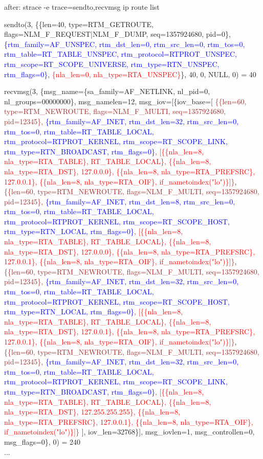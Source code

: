 \documentclass[unicode]{beamer}
\begin{document}
\begin{frame}[fragile]{\small after: strace -e trace=sendto,recvmsg ip route list}

{\texttt\tiny
\fontsize{4pt}{4pt}\selectfont
sendto(3, \{\{len=40, type=RTM\_GETROUTE, flags=NLM\_F\_REQUEST|NLM\_F\_DUMP, seq=1357924680, pid=0\},
 \textcolor{blue}{\{rtm\_family=AF\_UNSPEC, rtm\_dst\_len=0, rtm\_src\_len=0, rtm\_tos=0, rtm\_table=RT\_TABLE\_UNSPEC, rtm\_protocol=RTPROT\_UNSPEC, rtm\_scope=RT\_SCOPE\_UNIVERSE, rtm\_type=RTN\_UNSPEC, rtm\_flags=0\}},
  \textcolor{red}{\{nla\_len=0, nla\_type=RTA\_UNSPEC\}}\}, 40, 0, NULL, 0) = 40

\medskip

recvmsg(3, \{msg\_name=\{sa\_family=AF\_NETLINK, nl\_pid=0, nl\_groups=00000000\}, msg\_namelen=12, msg\_iov=[\{iov\_base=[
\textcolor{brown}{\{\{len=60, type=RTM\_NEWROUTE, flags=NLM\_F\_MULTI, seq=1357924680, pid=12345\},
 \textcolor{blue}{\{rtm\_family=AF\_INET, rtm\_dst\_len=32, rtm\_src\_len=0, rtm\_tos=0, rtm\_table=RT\_TABLE\_LOCAL, rtm\_protocol=RTPROT\_KERNEL, rtm\_scope=RT\_SCOPE\_LINK, rtm\_type=RTN\_BROADCAST, rtm\_flags=0\}},
  \textcolor{red}{[\{\{nla\_len=8, nla\_type=RTA\_TABLE\}, RT\_TABLE\_LOCAL\}, \{\{nla\_len=8, nla\_type=RTA\_DST\}, 127.0.0.0\}, \{\{nla\_len=8, nla\_type=RTA\_PREFSRC\}, 127.0.0.1\}, \{\{nla\_len=8, nla\_type=RTA\_OIF\}, if\_nametoindex("lo")\}]}\}},
\textcolor{brown}{\{\{len=60, type=RTM\_NEWROUTE, flags=NLM\_F\_MULTI, seq=1357924680, pid=12345\},
 \textcolor{blue}{\{rtm\_family=AF\_INET, rtm\_dst\_len=8, rtm\_src\_len=0, rtm\_tos=0, rtm\_table=RT\_TABLE\_LOCAL, rtm\_protocol=RTPROT\_KERNEL, rtm\_scope=RT\_SCOPE\_HOST, rtm\_type=RTN\_LOCAL, rtm\_flags=0\}},
  \textcolor{red}{[\{\{nla\_len=8, nla\_type=RTA\_TABLE\}, RT\_TABLE\_LOCAL\}, \{\{nla\_len=8, nla\_type=RTA\_DST\}, 127.0.0.0\}, \{\{nla\_len=8, nla\_type=RTA\_PREFSRC\}, 127.0.0.1\}, \{\{nla\_len=8, nla\_type=RTA\_OIF\}, if\_nametoindex("lo")\}]}\}},
\textcolor{brown}{\{\{len=60, type=RTM\_NEWROUTE, flags=NLM\_F\_MULTI, seq=1357924680, pid=12345\},
 \textcolor{blue}{\{rtm\_family=AF\_INET, rtm\_dst\_len=32, rtm\_src\_len=0, rtm\_tos=0, rtm\_table=RT\_TABLE\_LOCAL, rtm\_protocol=RTPROT\_KERNEL, rtm\_scope=RT\_SCOPE\_HOST, rtm\_type=RTN\_LOCAL, rtm\_flags=0\}},
  \textcolor{red}{[\{\{nla\_len=8, nla\_type=RTA\_TABLE\}, RT\_TABLE\_LOCAL\}, \{\{nla\_len=8, nla\_type=RTA\_DST\}, 127.0.0.1\}, \{\{nla\_len=8, nla\_type=RTA\_PREFSRC\}, 127.0.0.1\}, \{\{nla\_len=8, nla\_type=RTA\_OIF\}, if\_nametoindex("lo")\}]}\}},
\textcolor{brown}{\{\{len=60, type=RTM\_NEWROUTE, flags=NLM\_F\_MULTI, seq=1357924680, pid=12345\},
 \textcolor{blue}{\{rtm\_family=AF\_INET, rtm\_dst\_len=32, rtm\_src\_len=0, rtm\_tos=0, rtm\_table=RT\_TABLE\_LOCAL, rtm\_protocol=RTPROT\_KERNEL, rtm\_scope=RT\_SCOPE\_LINK, rtm\_type=RTN\_BROADCAST, rtm\_flags=0\}},
  \textcolor{red}{[\{\{nla\_len=8, nla\_type=RTA\_TABLE\}, RT\_TABLE\_LOCAL\}, \{\{nla\_len=8, nla\_type=RTA\_DST\}, 127.255.255.255\}, \{\{nla\_len=8, nla\_type=RTA\_PREFSRC\}, 127.0.0.1\}, \{\{nla\_len=8, nla\_type=RTA\_OIF\}, if\_nametoindex("lo")\}]}\}}
], iov\_len=32768\}], msg\_iovlen=1, msg\_controllen=0, msg\_flags=0\}, 0) = 240 \\

...
}
\end{frame}
\end{document}
